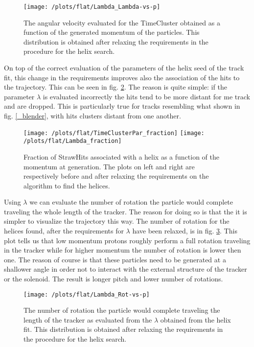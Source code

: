 \documentclass[12pt,a4paper,openright, oneside, titlepage]{book} %
\begin{document}
\begin{figure}[h!]
\centering
\texttt{[image: /plots/flat/Lambda\_Lambda-vs-p]}
\caption{The angular velocity evaluated for the TimeCluster obtained as a function of the generated momentum of the particles. This distribution is obtained after relaxing the requirements in the procedure for the helix search.}
\label{_Lambda_Lambda-vs-p}
\end{figure}

\noindent On top of the correct evaluation of the parameters of the helix seed of the track fit, this change in the requirements improves also the association of the hits to the trajectory. This can be seen in fig. \ref{_active_SH_fraction}. 
The reason is quite simple: if the parameter $\lambda$ is evaluated incorrectly the hits tend to be more distant for me track and are dropped. This is particularly true for tracks resembling what shown in fig. \ref{_blender}, with hits clusters distant from one another. \\

\begin{figure}[h!]
\centering
\texttt{[image: /plots/flat/TimeClusterPar\_fraction]}\hfill
\texttt{[image: /plots/flat/Lambda\_fraction]}
\caption{Fraction of StrawHits associated with a helix as a function of the momentum at generation. The plots on left and right are respectively before and after relaxing the requirements on the algorithm to find the helices.}
\label{_active_SH_fraction}
\end{figure}

\noindent Using $\lambda$ we can evaluate the number of rotation the particle would complete traveling the whole length of the tracker. 
The reason for doing so is that the it is simpler to visualize the trajectory this way. 
The number of rotation for the helices found, after the requirements for $\lambda$ have been relaxed, is in fig. \ref{_Lambda_Rot-vs-p}. 
This plot tells us that low momentum protons roughly perform a full rotation traveling in the tracker while for higher momentum the number of rotation is lower then one. 
The reason of course is that these particles need to be generated at a shallower angle in order not to interact with the external structure of the tracker or the solenoid. The result is longer pitch and lower number of rotations.\\


\begin{figure}[h!]
\centering
\texttt{[image: /plots/flat/Lambda\_Rot-vs-p]}
\caption{The number of rotation the particle would complete traveling the length of the tracker as evaluated from the $\lambda$ obtained from the helix fit. This distribution is obtained after relaxing the requirements in the procedure for the helix search.}
\label{_Lambda_Rot-vs-p}
\end{figure}
\end{document}
